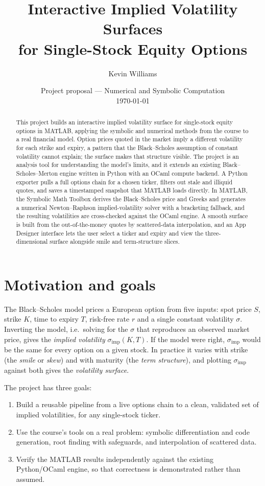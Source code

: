 \documentclass[11pt]{article}
\title{Interactive Implied Volatility Surfaces\\for Single-Stock Equity Options}
\author{Kevin Williams}
\date{Project proposal --- Numerical and Symbolic Computation\\\today}
\newcommand{\IV}{\sigma_{\mathrm{imp}}}
\begin{document}
\maketitle

\begin{abstract}
\noindent
This project builds an interactive implied volatility surface for single-stock equity options in MATLAB, applying the symbolic and numerical methods from the course to a real financial model. Option prices quoted in the market imply a different volatility for each strike and expiry, a pattern that the Black--Scholes assumption of constant volatility cannot explain; the surface makes that structure visible. The project is an analysis tool for understanding the model's limits, and it extends an existing Black--Scholes--Merton engine written in Python with an OCaml compute backend. A Python exporter pulls a full options chain for a chosen ticker, filters out stale and illiquid quotes, and saves a timestamped snapshot that MATLAB loads directly. In MATLAB, the Symbolic Math Toolbox derives the Black--Scholes price and Greeks and generates a numerical Newton--Raphson implied-volatility solver with a bracketing fallback, and the resulting volatilities are cross-checked against the OCaml engine. A smooth surface is built from the out-of-the-money quotes by scattered-data interpolation, and an App Designer interface lets the user select a ticker and expiry and view the three-dimensional surface alongside smile and term-structure slices.
\end{abstract}

\section{Motivation and goals}
The Black--Scholes model prices a European option from five inputs: spot price $S$, strike $K$, time to expiry $T$, risk-free rate $r$ and a single constant volatility $\sigma$. Inverting the model, i.e.\ solving for the $\sigma$ that reproduces an observed market price, gives the \emph{implied volatility} $\IV(K,T)$. If the model were right, $\IV$ would be the same for every option on a given stock. In practice it varies with strike (the \emph{smile} or \emph{skew}) and with maturity (the \emph{term structure}), and plotting $\IV$ against both gives the \emph{volatility surface}.

The project has three goals:
\begin{enumerate}
  \item Build a reusable pipeline from a live options chain to a clean, validated set of implied volatilities, for any single-stock ticker.
  \item Use the course's tools on a real problem: symbolic differentiation and code generation, root finding with safeguards, and interpolation of scattered data.
  \item Verify the MATLAB results independently against the existing Python/OCaml engine, so that correctness is demonstrated rather than assumed.
\end{enumerate}
\end{document}
